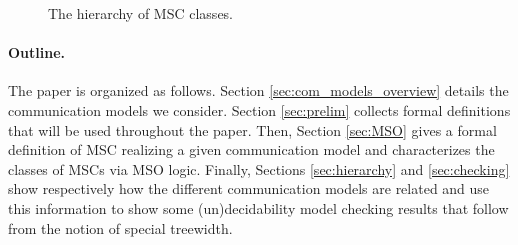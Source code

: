 \begin{figure}[h]
	\centering
	\caption{The hierarchy of MSC classes.}
	\label{fig:msc_hierarchy_full}
\end{figure}



\paragraph{Outline.} The paper is organized as follows. Section \ref{sec:com_models_overview} details the communication models we consider. Section \ref{sec:prelim} collects formal definitions that will be used throughout the paper. Then, Section \ref{sec:MSO} gives a formal definition of MSC realizing a given communication model and characterizes the classes of MSCs via MSO logic. Finally, Sections \ref{sec:hierarchy} and \ref{sec:checking} show respectively how the different communication models are related and use this information to show some (un)decidability model checking results that follow from the notion of special treewidth.

